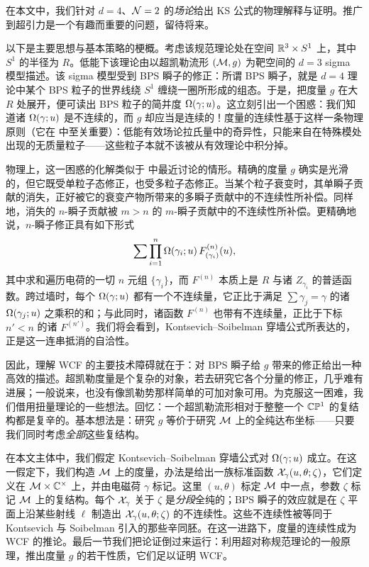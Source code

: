 在本文中，我们针对 $d=4$、$\mathcal{N}=2$ 的\emph{场论}给出 KS 公式的物理解释与证明。推广到超引力是一个有趣而重要的问题，留待将来。

以下是主要思想与基本策略的梗概。考虑该规范理论处在空间 $\mathbb{R}^3\times S^1$ 上，其中 $S^1$ 的半径为 $R$。低能下该理论由以超凯勒流形 $(\mathcal{M},g)$ 为靶空间的 $d=3$ sigma 模型描述。该 sigma 模型受到 BPS 瞬子的修正：所谓 BPS 瞬子，就是 $d=4$ 理论中某个 BPS 粒子的世界线绕 $S^1$ 缠绕一圈所形成的组态。于是，把度量 $g$ 在大 $R$ 处展开，便可读出 BPS 粒子的简并度 $\Omega(\gamma;u)$。这立刻引出一个困惑：我们知道诸 $\Omega(\gamma;u)$ 是不连续的，而 $g$ 却应当是连续的！度量的连续性基于这样一条物理原则（它在 \cite{Seiberg:1994rs,Seiberg:1994aj} 中至关重要）：低能有效场论拉氏量中的奇异性，只能来自在特殊模处出现的无质量粒子——这些粒子本就不该被从有效理论中积分掉。

物理上，这一困惑的化解类似于 \cite{GarciaEtxebarria:2007zv} 中最近讨论的情形。精确的度量 $g$ 确实是光滑的，但它既受单粒子态修正，也受多粒子态修正。当某个粒子衰变时，其单瞬子贡献的消失，正好被它的衰变产物所带来的多瞬子贡献中的不连续性所补偿。同样地，消失的 $n$-瞬子贡献被 $m>n$ 的 $m$-瞬子贡献中的不连续性所补偿。更精确地说，$n$-瞬子修正具有如下形式
\[
\sum \prod_{i=1}^{n}\Omega(\gamma_i;u)\,F^{(n)}_{(\gamma_i)}(u),
\]
其中求和遍历电荷的一切 $n$ 元组 $\{\gamma_i\}$，而 $F^{(n)}$ 本质上是 $R$ 与诸 $Z_{\gamma_i}$ 的普适函数。跨过墙时，每个 $\Omega(\gamma;u)$ 都有一个不连续量，它正比于满足 $\sum\gamma_j=\gamma$ 的诸 $\Omega(\gamma_j;u)$ 之乘积的和；与此同时，诸函数 $F^{(n)}$ 也带有不连续量，正比于下标 $n'<n$ 的诸 $F^{(n')}$。我们将会看到，Kontsevich--Soibelman 穿墙公式所表达的，正是这一连串抵消的自洽性。

因此，理解 WCF 的主要技术障碍就在于：对 BPS 瞬子给 $g$ 带来的修正给出一种高效的描述。超凯勒度量是个复杂的对象，若去研究它各个分量的修正，几乎难有进展；一般说来，也没有像凯勒势那样简单的可加对象可用。为克服这一困难，我们借用扭量理论的一些想法。回忆：一个超凯勒流形相对于整整一个 $\mathbb{C}\mathbb{P}^1$ 的复结构都是复辛的。基本想法是：研究 $g$ 等价于研究 $\mathcal{M}$ 上的全纯达布坐标——只要我们同时考虑\emph{全部}这些复结构。

在本文主体中，我们假定 Kontsevich--Soibelman 穿墙公式对 $\Omega(\gamma;u)$ 成立。在这一假定下，我们构造 $\mathcal{M}$ 上的度量，办法是给出一族标准函数 $\mathcal{X}_\gamma(u,\theta;\zeta)$，它们定义在 $\mathcal{M}\times\mathbb{C}^\times$ 上，并由电磁荷 $\gamma$ 标记。这里 $(u,\theta)$ 标定 $\mathcal{M}$ 中一点，参数 $\zeta$ 标记 $\mathcal{M}$ 上的复结构。每个 $\mathcal{X}_\gamma$ 关于 $\zeta$ 是\emph{分段}全纯的；BPS 瞬子的效应就是在 $\zeta$ 平面上沿某些射线 $\ell$ 制造出 $\mathcal{X}_\gamma(u,\theta;\zeta)$ 的不连续性。这些不连续性被等同于 Kontsevich 与 Soibelman 引入的那些辛同胚。在这一进路下，度量的连续性成为 WCF 的推论。最后一节我们把论证倒过来运行：利用超对称规范理论的一般原理，推出度量 $g$ 的若干性质，它们足以证明 WCF。

